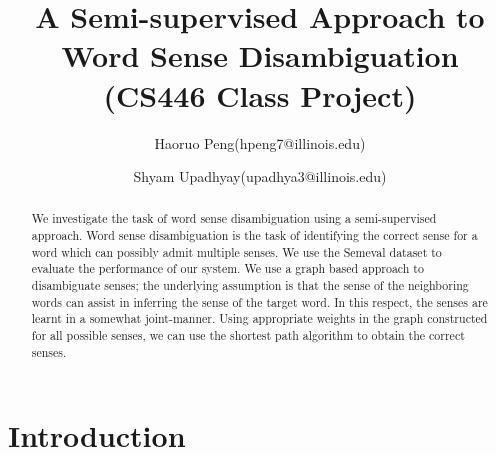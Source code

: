 \documentclass[11pt,letterpaper]{article}
\newcommand{\blue}[1]{\textcolor{RoyalBlue}{#1}}
\newcommand{\instructions}[1]{\blue{\textit{#1}}}
\begin{document}
\title{A Semi-supervised Approach to Word Sense Disambiguation \\ \Large{(CS446 Class Project)}}
\author{Haoruo Peng(hpeng7@illinois.edu) \and Shyam Upadhyay(upadhya3@illinois.edu)}
\maketitle





\begin{abstract}
We investigate the task of word sense disambiguation using a semi-supervised approach. Word sense disambiguation is the task of identifying the correct sense for a word which can possibly admit multiple senses. We use the Semeval dataset to evaluate the performance of our system. We use a graph based approach to disambiguate senses; the underlying assumption is that the sense of the neighboring words can assist in inferring the sense of the target word. In this respect, the senses are learnt in a somewhat joint-manner. Using appropriate weights in the graph constructed for all possible senses, we can use the shortest path algorithm to obtain the correct senses.
\end{abstract}


\section{Introduction} 
\label{sec:introduction}
\end{document}
